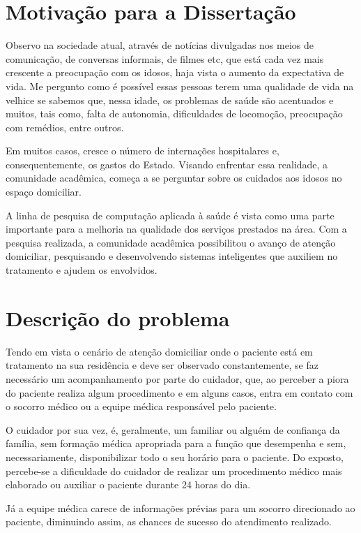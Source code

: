 \section{Motivação para a Dissertação}\label{sec:motivacao}

Observo na sociedade atual, através de notícias divulgadas nos meios
de comunicação, de conversas informais, de filmes etc, que está cada
vez mais crescente a preocupação com os idosos, haja vista o
aumento da expectativa de vida. Me pergunto como é possível essas pessoas
terem uma qualidade de vida na velhice se sabemos que, nessa idade,
os problemas de saúde são acentuados e muitos, tais como, falta de autonomia,
dificuldades de locomoção, preocupação com remédios, entre outros.

Em muitos casos, cresce o número de internações hospitalares e,
consequentemente, os gastos do Estado. Visando enfrentar essa 
realidade, a comunidade acadêmica, %
começa a se perguntar sobre os cuidados aos idosos no espaço domiciliar.

A linha de pesquisa de computação aplicada à saúde é vista como uma parte
importante para a melhoria na qualidade dos serviços prestados na área.
Com a pesquisa realizada, a comunidade acadêmica possibilitou o avanço
de atenção domiciliar, pesquisando e desenvolvendo sistemas inteligentes
que auxiliem no tratamento e ajudem os envolvidos.

\section{Descrição do problema}\label{sec:descricao-problema}

Tendo em vista o cenário de atenção domiciliar onde o paciente
está em tratamento na sua residência e deve ser observado constantemente, 
se faz necessário um acompanhamento por parte do cuidador, que, ao perceber 
a piora do paciente realiza algum procedimento e em alguns casos, entra 
em contato com o socorro médico ou a equipe médica responsável pelo paciente.

O cuidador por sua vez, é, geralmente, um familiar ou alguém de confiança
da família, sem formação médica apropriada para a função que desempenha 
e sem, necessariamente, disponibilizar todo o seu horário para o paciente.
Do exposto, percebe-se a dificuldade do cuidador de realizar um procedimento
médico mais elaborado ou auxiliar o paciente durante 24 horas do dia.

Já a equipe médica carece de informações prévias para
um socorro direcionado ao paciente, diminuindo assim, as chances
de sucesso do atendimento realizado.

